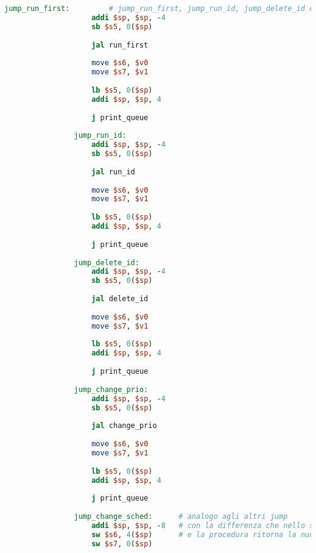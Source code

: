 \begin{center}
\begin{lstlisting}[language=mips, gobble=14, stepnumber=1]
                jump_run_first:         # jump_run_first, jump_run_id, jump_delete_id e jump_change_prio analoghi a jump_insert_task
                    addi $sp, $sp, -4
                    sb $s5, 0($sp)
                    
                    jal run_first
                    
                    move $s6, $v0
                    move $s7, $v1
                    
                    lb $s5, 0($sp)
                    addi $sp, $sp, 4
                    
                    j print_queue
                    
                jump_run_id:
                    addi $sp, $sp, -4
                    sb $s5, 0($sp)
                    
                    jal run_id
                    
                    move $s6, $v0
                    move $s7, $v1
                    
                    lb $s5, 0($sp)
                    addi $sp, $sp, 4
                    
                    j print_queue
                    
                jump_delete_id:
                    addi $sp, $sp, -4
                    sb $s5, 0($sp)
                    
                    jal delete_id
                    
                    move $s6, $v0
                    move $s7, $v1
                    
                    lb $s5, 0($sp)
                    addi $sp, $sp, 4
                    
                    j print_queue
                    
                jump_change_prio:
                    addi $sp, $sp, -4
                    sb $s5, 0($sp)
                    
                    jal change_prio
                    
                    move $s6, $v0
                    move $s7, $v1
                    
                    lb $s5, 0($sp)
                    addi $sp, $sp, 4
                    
                    j print_queue
                    
                jump_change_sched:      # analogo agli altri jump
                    addi $sp, $sp, -8   # con la differenza che nello stack si salvano i due puntatori
                    sw $s6, 4($sp)      # e la procedura ritorna la nuova politica di scheduling
                    sw $s7, 0($sp)
                    

\end{lstlisting}
\end{center}
